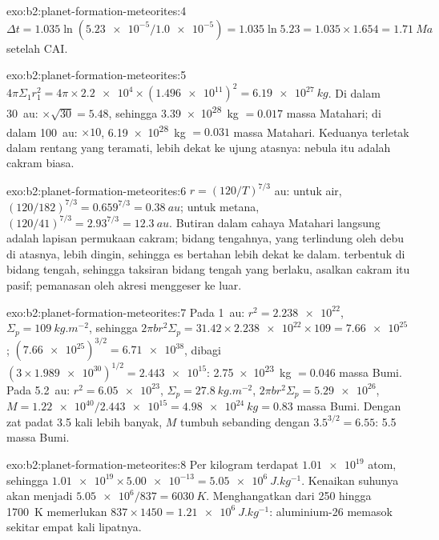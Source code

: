 \begin{solution}{exo:b2:planet-formation-meteorites:4}
$\Delta t = 1.035\ln(\num{5.23e-5}/\num{1.0e-5}) = 1.035\ln 5.23 =
1.035\times1.654 = \qty{1.71}{Ma}$ setelah CAI.
\end{solution}

\begin{solution}{exo:b2:planet-formation-meteorites:5}
$4\pi\Sigma_1 r_1^2 = 4\pi\times\num{2.2e4}\times(\num{1.496e11})^2 =
\qty{6.19e27}{kg}$. Di dalam \qty{30}{au}: $\times\sqrt{30} = 5.48$, sehingga
\qty{3.39e28}{kg} $= 0.017$ massa Matahari; di dalam \qty{100}{au}: $\times10$,
\qty{6.19e28}{kg} $= 0.031$ massa Matahari. Keduanya terletak dalam rentang yang teramati,
lebih dekat ke ujung atasnya: nebula itu adalah cakram biasa.
\end{solution}

\begin{solution}{exo:b2:planet-formation-meteorites:6}
$r = (120/T)^{7/3}$ au: untuk air, $(120/182)^{7/3} = 0.659^{7/3} =
\qty{0.38}{au}$; untuk metana, $(120/41)^{7/3} = 2.93^{7/3} = \qty{12.3}{au}$.
Butiran dalam cahaya Matahari langsung adalah lapisan permukaan cakram; bidang tengahnya,
yang terlindung oleh debu di atasnya, lebih dingin, sehingga es bertahan lebih dekat ke dalam.
 terbentuk di bidang tengah, sehingga taksiran bidang tengah yang berlaku, asalkan
cakram itu pasif; pemanasan oleh akresi menggeser  ke luar.
\end{solution}

\begin{solution}{exo:b2:planet-formation-meteorites:7}
Pada \qty{1}{au}: $r^2 = \num{2.238e22}$, $\Sigma_p = \qty{109}{kg.m^{-2}}$, sehingga
$2\pi b r^2\Sigma_p = 31.42\times\num{2.238e22}\times109 = \num{7.66e25}$;
$(\num{7.66e25})^{3/2} = \num{6.71e38}$, dibagi
$(3\times\num{1.989e30})^{1/2} = \num{2.443e15}$: \qty{2.75e23}{kg}
$= 0.046$ massa Bumi. Pada \qty{5.2}{au}: $r^2 = \num{6.05e23}$,
$\Sigma_p = \qty{27.8}{kg.m^{-2}}$, $2\pi b r^2\Sigma_p = \num{5.29e26}$,
$M = \num{1.22e40}/\num{2.443e15} = \qty{4.98e24}{kg} = 0.83$ massa Bumi.
Dengan zat padat \num{3.5} kali lebih banyak, $M$ tumbuh sebanding dengan $3.5^{3/2} = 6.55$: 5.5 massa
Bumi.
\end{solution}

\begin{solution}{exo:b2:planet-formation-meteorites:8}
Per kilogram terdapat $\num{1.01e19}$ atom, sehingga
$\num{1.01e19}\times\num{5.00e-13} = \qty{5.05e6}{J.kg^{-1}}$. Kenaikan
suhunya akan menjadi $\num{5.05e6}/837 = \qty{6030}{K}$. Menghangatkan dari \num{250} hingga
\qty{1700}{K} memerlukan $837\times1450 = \qty{1.21e6}{J.kg^{-1}}$: aluminium-26
memasok sekitar empat kali lipatnya.
\end{solution}

